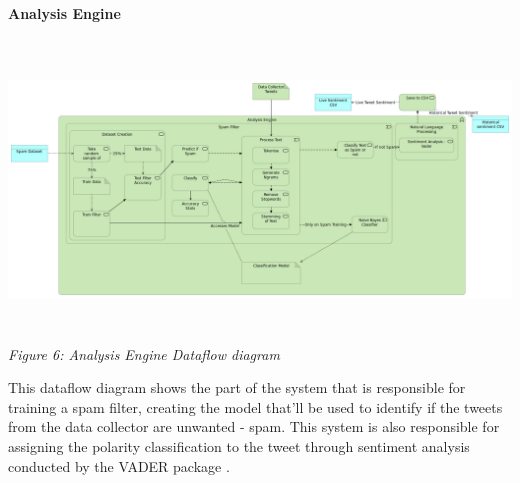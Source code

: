 \documentclass[oneside, 12pt]{article}
\begin{document}
		\textbf{Analysis Engine}
		\begin{center}
			\includegraphics[width=17cm,height=8cm]{images/Analysis_Engine.png}
			\textit{Figure 6: Analysis Engine Dataflow diagram}
		\end{center}
		This dataflow diagram shows the part of the system that is responsible for training a spam filter, creating the model that'll be used to identify if the tweets from the data collector are unwanted - spam. This system is also responsible for assigning the polarity classification to the tweet through sentiment analysis conducted by the VADER package \cite{12}.
\end{document}
